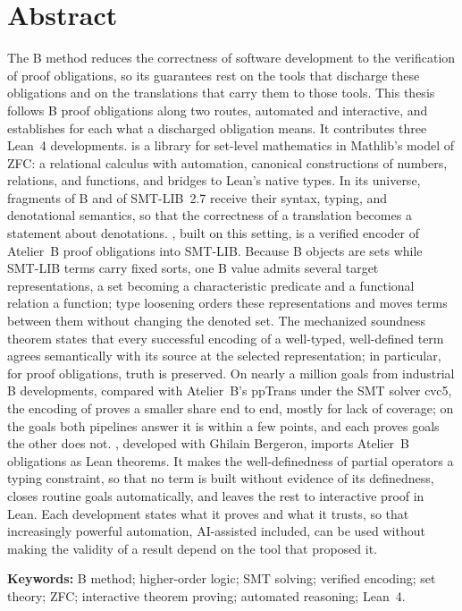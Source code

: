 \chapter*{Abstract}

\begingroup
\ifThesisAfive
  \vspace*{-36pt}
\fi


\noindent
The B method reduces the correctness of software development to the
verification of proof obligations, so its guarantees rest on the tools that
discharge these obligations and on the translations that carry them to those
tools. This thesis follows B proof obligations along two routes, automated and
interactive, and establishes for each what a discharged obligation means. It
contributes three Lean~4 developments. \zflean{} is a library for set-level
mathematics in Mathlib's model of ZFC: a relational calculus with automation,
canonical constructions of numbers, relations, and functions, and bridges to
Lean's native types. In its universe, fragments of B and of SMT-LIB~2.7
receive their syntax, typing, and denotational semantics, so that the
correctness of a translation becomes a statement about denotations. \beer{},
built on this setting, is a verified encoder of Atelier~B proof obligations
into SMT-LIB. Because B objects are sets while SMT-LIB terms carry fixed
sorts, one B value admits several target representations, a set becoming a
characteristic predicate and a functional relation a function; type loosening
orders these representations and moves terms between them without changing
the denoted set. The mechanized soundness theorem states that every successful
encoding of a well-typed, well-defined term agrees semantically with its
source at the selected representation; in particular, for proof obligations,
truth is preserved. On nearly a million goals from industrial B developments,
compared with Atelier~B's ppTrans under the SMT solver cvc5, the encoding of
\beer{} proves a smaller share end to end, mostly for lack of coverage; on the
goals both pipelines answer it is within a few points, and each proves goals
the other does not. \barrel{}, developed with Ghilain Bergeron, imports
Atelier~B obligations as Lean theorems. It makes the well-definedness of
partial operators a typing constraint, so that no term is built without
evidence of its definedness, closes routine goals automatically, and leaves
the rest to interactive proof in Lean. Each development states what it proves
and what it trusts, so that increasingly powerful automation, AI-assisted
included, can be used without making the validity of a result depend on the
tool that proposed it.

\bigskip
\noindent\textbf{Keywords:} B method; higher-order logic; SMT solving; verified
encoding; set theory; ZFC; interactive theorem proving; automated reasoning; Lean~4.
\par\endgroup
